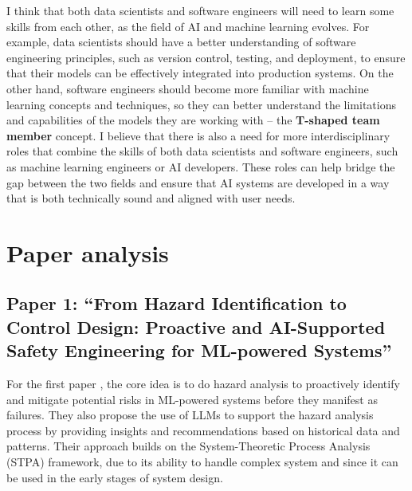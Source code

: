 \documentclass[a4paper,11pt]{article}
\begin{document}
I think that both data scientists and software engineers will need to learn some skills from each other, as the field of AI and machine learning evolves.
For example, data scientists should have a better understanding of software engineering principles, such as version control, testing, and deployment, to ensure that their models can be effectively integrated into production systems. On the other hand, software engineers should become more familiar with machine learning concepts and techniques, so they can better understand the limitations and capabilities of the models they are working with -- the \textbf{T-shaped team member} concept.
I believe that there is also a need for more interdisciplinary roles that combine the skills of both data scientists and software engineers, such as machine learning engineers or AI developers. These roles can help bridge the gap between the two fields and ensure that AI systems are developed in a way that is both technically sound and aligned with user needs.


\section{Paper analysis}
\subsection{Paper 1: ``From Hazard Identification to Control Design: Proactive and AI-Supported Safety Engineering for ML-powered Systems''}
For the first paper \cite{Hong2025}, the core idea is to do hazard analysis to proactively identify and mitigate potential risks in ML-powered systems before they manifest as failures. They also propose the use of LLMs to support the hazard analysis process by providing insights and recommendations based on historical data and patterns. Their approach builds on the System-Theoretic Process Analysis (STPA) framework, due to its ability to handle complex system and since it can be used in the early stages of system design.
\end{document}
